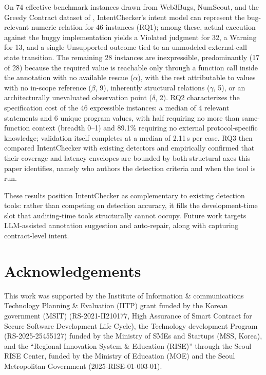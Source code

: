 \documentclass[pdflatex,sn-basic]{sn-jnl}%
\theoremstyle{thmstyleone}%
\theoremstyle{thmstyletwo}%
\theoremstyle{thmstylethree}%
\begin{document}
On 74 effective benchmark instances drawn from Web3Bugs, NumScout, and the Greedy Contract dataset of \citet{flyinointment}, IntentChecker's intent model can represent the bug-relevant numeric relation for 46 instances (RQ1); among these, actual execution against the buggy implementation yields a Violated judgment for 32, a Warning for 13, and a single Unsupported outcome tied to an unmodeled external-call state transition. The remaining 28 instances are inexpressible, predominantly (17 of 28) because the required value is reachable only through a function call inside the annotation with no available rescue ($\alpha$), with the rest attributable to values with no in-scope reference ($\beta$, 9), inherently structural relations ($\gamma$, 5), or an architecturally unevaluated observation point ($\delta$, 2). RQ2 characterizes the specification cost of the 46 expressible instances: a median of 4 relevant statements and 6 unique program values, with half requiring no more than same-function context (breadth 0--1) and 89.1\% requiring no external protocol-specific knowledge; validation itself completes at a median of 2.11\,s per case. RQ3 then compared IntentChecker with existing detectors and empirically confirmed that their coverage and latency envelopes are bounded by both structural axes this paper identifies, namely who authors the detection criteria and when the tool is run.

These results position IntentChecker as complementary to existing detection tools: rather than competing on detection accuracy, it fills the development-time slot that auditing-time tools structurally cannot occupy. Future work targets LLM-assisted annotation suggestion and auto-repair, along with capturing contract-level intent.

\section*{Acknowledgements}
This work was supported by the Institute of Information \& communications Technology Planning \& Evaluation (IITP) grant funded by the Korean government (MSIT) (RS-2021-II210177, High Assurance of Smart Contract for Secure Software Development Life Cycle), the Technology development Program (RS-2025-25455127) funded by the Ministry of SMEs and Startups (MSS, Korea), and the ``Regional Innovation System \& Education (RISE)'' through the Seoul RISE Center, funded by the Ministry of Education (MOE) and the Seoul Metropolitan Government (2025-RISE-01-003-01).
\end{document}
